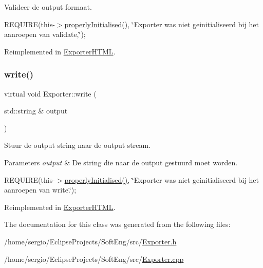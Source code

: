 Valideer de output formaat. 

R\+E\+Q\+U\+I\+RE(this-\/$>$\hyperlink{class_exporter_afb6185b8276c2fd03da53f49e4da295b}{properly\+Initialised()}, \char`\"{}\+Exporter was niet geinitialiseerd bij het aanroepen van validate,\char`\"{});~\newline


Reimplemented in \hyperlink{class_exporter_h_t_m_l_ac44697b53a77a01e394a12bfc11c93f1}{Exporter\+H\+T\+ML}.

\mbox{\label{class_exporter_a96a1f764ef33d11d118f3170a3ca7e1a}} 
\subsubsection{\texorpdfstring{write()}{write()}}
{\footnotesize\ttfamily virtual void Exporter\+::write (\begin{DoxyParamCaption}\item[{std\+::string \&}]{output }\end{DoxyParamCaption})\hspace{0.3cm}{\ttfamily [virtual]}}



Stuur de output string naar de output stream. 


\begin{DoxyParams}{Parameters}
{\em output} & De string die naar de output gestuurd moet worden.\\
\hline
\end{DoxyParams}
R\+E\+Q\+U\+I\+RE(this-\/$>$\hyperlink{class_exporter_afb6185b8276c2fd03da53f49e4da295b}{properly\+Initialised()}, \char`\"{}\+Exporter was niet geinitialiseerd bij het aanroepen van write.\char`\"{});~\newline


Reimplemented in \hyperlink{class_exporter_h_t_m_l_aa14cd2dde581c96a0414ad3e886a38c8}{Exporter\+H\+T\+ML}.



The documentation for this class was generated from the following files\+:\begin{DoxyCompactItemize}
\item 
/home/sergio/\+Eclipse\+Projects/\+Soft\+Eng/src/\hyperlink{_exporter_8h}{Exporter.\+h}\item 
/home/sergio/\+Eclipse\+Projects/\+Soft\+Eng/src/\hyperlink{_exporter_8cpp}{Exporter.\+cpp}\end{DoxyCompactItemize}
